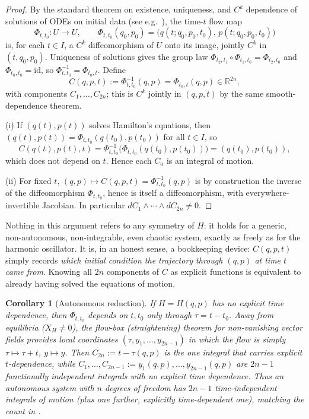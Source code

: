 \documentclass[11pt]{article}
\newtheorem{corollary}[theorem]{Corollary}
\theoremstyle{definition}
\theoremstyle{remark}
\begin{document}
\begin{proof}
By the standard theorem on existence, uniqueness, and $C^k$ dependence of
solutions of ODEs on initial data (see e.g.\ \cite{hartman}), the time-$t$
flow map
\begin{equation}
\Phi_{t,t_0}:U\to U,\qquad \Phi_{t,t_0}(q_0,p_0)=\big(q(t;q_0,p_0,t_0),\,p(t;q_0,p_0,t_0)\big)
\end{equation}
is, for each $t\in I$, a $C^k$ diffeomorphism of $U$ onto its image, jointly
$C^k$ in $(t,q_0,p_0)$. Uniqueness of solutions gives the group law
$\Phi_{t_2,t_1}\circ\Phi_{t_1,t_0}=\Phi_{t_2,t_0}$ and $\Phi_{t_0,t_0}=\mathrm{id}$,
so $\Phi_{t,t_0}^{-1}=\Phi_{t_0,t}$. Define
\begin{equation}
C(q,p,t):=\Phi_{t,t_0}^{-1}(q,p)=\Phi_{t_0,t}(q,p)\in\mathbb R^{2n},
\end{equation}
with components $C_1,\dots,C_{2n}$; this is $C^k$ jointly in $(q,p,t)$ by
the same smooth-dependence theorem.

(i) If $(q(t),p(t))$ solves Hamilton's equations, then
$(q(t),p(t))=\Phi_{t,t_0}(q(t_0),p(t_0))$ for all $t\in I$, so
\begin{equation}
C(q(t),p(t),t)=\Phi_{t,t_0}^{-1}\big(\Phi_{t,t_0}(q(t_0),p(t_0))\big)=(q(t_0),p(t_0)),
\end{equation}
which does not depend on $t$. Hence each $C_a$ is an integral of motion.

(ii) For fixed $t$, $(q,p)\mapsto C(q,p,t)=\Phi_{t,t_0}^{-1}(q,p)$ is by
construction the inverse of the diffeomorphism $\Phi_{t,t_0}$, hence is
itself a diffeomorphism, with everywhere-invertible Jacobian. In
particular $dC_1\wedge\cdots\wedge dC_{2n}\ne 0$.
\end{proof}

Nothing in this argument refers to any symmetry of $H$: it holds for a
generic, non-autonomous, non-integrable, even chaotic system, exactly as
freely as for the harmonic oscillator. It is, in an honest sense, a
bookkeeping device: $C(q,p,t)$ simply records \emph{which initial condition
the trajectory through $(q,p)$ at time $t$ came from}. Knowing all $2n$
components of $C$ as explicit functions is equivalent to already having
solved the equations of motion.

\begin{corollary}[Autonomous reduction]\label{cor:autonomous}
If $H=H(q,p)$ has no explicit time dependence, then $\Phi_{t,t_0}$ depends
on $t,t_0$ only through $\tau=t-t_0$. Away from equilibria ($X_H\ne 0$),
the flow-box (straightening) theorem for non-vanishing vector fields
provides local coordinates $(\tau,y_1,\dots,y_{2n-1})$ in which the flow is
simply $\tau\mapsto\tau+t$, $y\mapsto y$. Then $C_{2n}:=t-\tau(q,p)$ is the
one integral that carries explicit $t$-dependence, while
$C_1,\dots,C_{2n-1}:=y_1(q,p),\dots,y_{2n-1}(q,p)$ are $2n-1$ functionally
independent integrals with \emph{no} explicit time dependence. Thus an
autonomous system with $n$ degrees of freedom has $2n-1$ time-independent
integrals of motion (plus one further, explicitly time-dependent one),
matching the count in \cite{landau}.
\end{corollary}
\end{document}
